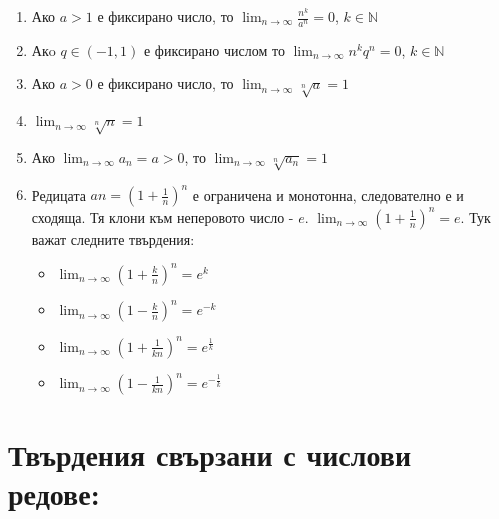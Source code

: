 \documentclass[11pt,oneside,a4paper]{article}
\begin{document}
\begin{enumerate}
    \item Ако \(a > 1\) е фиксирано число, то \(\displaystyle \lim_{n \to \infty} \frac{n^k}{a^n} = 0\), \(k \in \mathbb{N}\)
    \item Акo \(q \in (-1, 1)\) е фиксирано числом то \(\displaystyle \lim_{n \to \infty} n^kq^n = 0\), \(k \in \mathbb{N}\)
    \item Ако \(a > 0\) е фиксирано число, то \(\displaystyle \lim_{n \to \infty} \sqrt[n]{a} = 1\)
    \item \(\displaystyle \lim_{n \to \infty} \sqrt[n]{n} = 1\)
    \item Ако \(\displaystyle \lim_{n \to \infty} a_n = a > 0\), то \(\displaystyle \lim_{n \to \infty} \sqrt[n]{a_n} = 1\)
    \item Редицата \(an = (1 + \frac{1}{n})^n\) е ограничена и монотонна, следователно е и сходяща. Тя клони към неперовото число - \(e\). \(\displaystyle \lim_{n \to \infty} (1 + \frac{1}{n})^n = e\). Тук важат следните твърдения:
    \begin{itemize}
        \item \(\displaystyle \lim_{n \to \infty} (1 + \frac{k}{n})^n = e^k\) 
        \item \(\displaystyle \lim_{n \to \infty} (1 - \frac{k}{n})^n = e^{-k}\) 
        \item \(\displaystyle \lim_{n \to \infty} (1 + \frac{1}{kn})^n = e^{\frac{1}{k}}\)
        \item \(\displaystyle \lim_{n \to \infty} (1 - \frac{1}{kn})^n = e^{-\frac{1}{k}}\)
    \end{itemize}
\end{enumerate}

\section*{Твърдения свързани с числови редове:}
\end{document}
